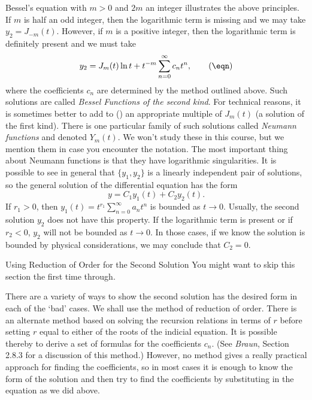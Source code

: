 Bessel's equation with $m > 0$  and $2m$ an
integer illustrates the above principles.   If 
$m$ is half an odd integer, then the logarithmic term is missing
and we may take
$y_2 = J_{-m}(t)$.   However, if $m$ is a positive integer,
then the logarithmic term is definitely present and
we must take
%
\nexteqn
$$
y_2  = J_m(t)\ln t + t^{-m}\sum_{n=0}^\infty c_n t^n,\tag\eqn
$$
where the coefficients $c_n$ are determined by the method outlined
above.
Such solutions are called
{\it Bessel Functions of
the second kind}.  For technical reasons, it is sometimes
%
better to add to (\eqn) an appropriate
multiple of $J_m(t)$ (a solution of the first kind).   There is
one particular family of such solutions called
{\it Neumann functions\/} and denoted
%
%
$Y_m(t)$.  We won't study these in this course, but we mention
them in case you encounter the notation.   The most important
thing about Neumann functions is that they have logarithmic
singularities.
%
\medskip
  It is possible to see in general that
$\{y_1, y_2\}$ is a linearly independent pair of solutions,
so the general solution of the differential equation has the
form
$$
y = C_1y_1(t) + C_2y_2(t).
$$
If $r_1 > 0$, then $y_1(t) = t^{r_1}\sum_{n=0}^\infty a_nt^n$
is bounded as $t \to 0$.   Usually, the second solution $y_2$
does not have this property.  If the logarithmic term is present
or if $r_2 < 0$, $y_2$ will not be bounded as $t \to 0$.  In
those cases, if we know the solution is bounded by physical
considerations, we may conclude that $C_2 = 0$.


\bigskip
\subhead Using Reduction of Order for the Second Solution \endsubhead
You might want to skip this section the first time through.

There are a variety of ways to show the second solution has the
desired form in each of the `bad' cases.   We shall use the
method of reduction of order.   There is an alternate method based
%
on solving the recursion relations in terms of $r$ before setting
$r$ equal to either of the roots of the indicial equation.   It
is possible thereby to derive a set of formulas for the coefficients
$c_n$.   (See {\it Braun\/}, Section 2.8.3 for a discussion of this
method.)   However, no method gives a really practical approach for
finding the coefficients, so in most cases it is enough to know the
form of the solution and then try to find the coefficients by
substituting in the equation as we did above.

